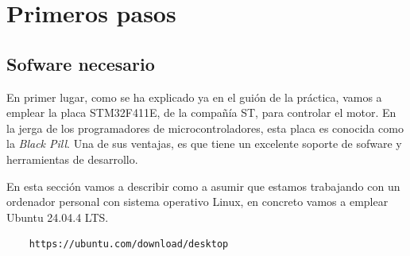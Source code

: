 \chapter{Primeros pasos}
\section{Sofware necesario}
En primer lugar, como se ha explicado ya en el guión de la práctica, vamos a emplear la placa STM32F411E, de la compañía ST, para controlar el motor. En la jerga de los programadores de microcontroladores, esta placa es conocida como la \emph{Black Pill}. Una de sus ventajas, es que tiene un excelente soporte de sofware y herramientas de desarrollo.

En esta sección vamos a describir como a asumir que estamos trabajando con un ordenador personal con sistema operativo Linux, en concreto vamos a emplear Ubuntu 24.04.4 LTS.
	\begin{verbatim}
	https://ubuntu.com/download/desktop
	\end{verbatim}


